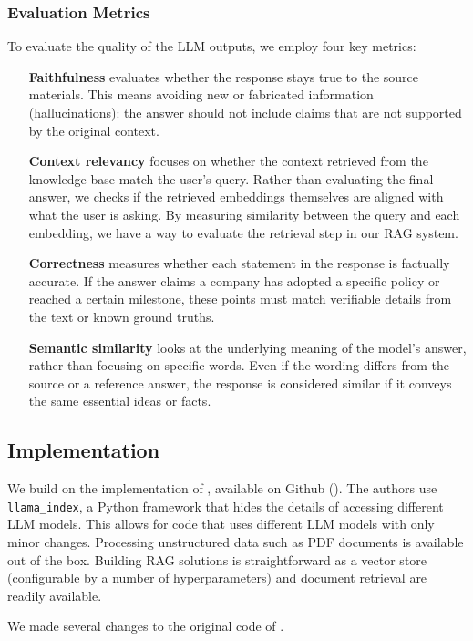 \documentclass[]{article}
\begin{document}
\subsubsection{Evaluation Metrics}
To evaluate the quality of the LLM outputs, we employ four key metrics:
\begin{itemize}
    \item [\textbf{Faithfulness}] evaluates whether the response stays true to the source materials. This means avoiding new or fabricated information (hallucinations): the answer should not include claims that are not supported by the original context.
    \item [\textbf{Context relevancy}] focuses on whether the context retrieved from the knowledge base match the user’s query. Rather than evaluating the final answer, we checks if the retrieved embeddings themselves are aligned with what the user is asking. By measuring similarity between the query and each embedding, we have a way to evaluate the retrieval step in our RAG system.
    \item [\textbf{Correctness}] measures whether each statement in the response is factually accurate. If the answer claims a company has adopted a specific policy or reached a certain milestone, these points must match verifiable details from the text or known ground truths.
    \item [\textbf{Semantic similarity}] looks at the underlying meaning of the model’s answer, rather than focusing on specific words. Even if the wording differs from the source or a reference answer, the response is considered similar if it conveys the same essential ideas or facts.
\end{itemize}

\subsection{Implementation}

We build on the implementation of \cite{durability}, available on Github (\cite{github-orig}).
The authors use \texttt{llama\_index}, a Python framework that hides the details of accessing different LLM models.
This allows for code that uses different LLM models with only minor changes.
Processing unstructured data such as PDF documents is available out of the box.
Building RAG solutions is straightforward as a vector store (configurable by a number of hyperparameters) and document retrieval are readily available.

We made several changes to the original code of \cite{durability}.
\end{document}
